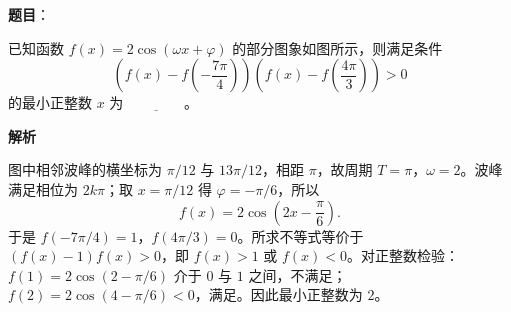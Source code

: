 \begin{answer}

\textbf{题目}：

已知函数 $f(x)=2\cos(\omega x+\varphi)$ 的部分图象如图所示，则满足条件
\nopagebreak[4]
\[
\left(f(x)-f\left(-\dfrac{7\pi}{4}\right)\right)\left(f(x)-f\left(\dfrac{4\pi}{3}\right)\right)>0
\]
的最小正整数 $x$ 为 $\underline{\qquad\qquad}$。
\nopagebreak[4]
\begin{center}\end{center}
\nopagebreak[4]
\textbf{解析}

图中相邻波峰的横坐标为 $\pi/12$ 与 $13\pi/12$，相距 $\pi$，故周期 $T=\pi$，$\omega=2$。波峰满足相位为 $2k\pi$；取 $x=\pi/12$ 得 $\varphi=-\pi/6$，所以
\nopagebreak[4]
\[
f(x)=2\cos\left(2x-\frac\pi6\right).
\]
于是 $f(-7\pi/4)=1$，$f(4\pi/3)=0$。所求不等式等价于 $(f(x)-1)f(x)>0$，即 $f(x)>1$ 或 $f(x)<0$。对正整数检验：$f(1)=2\cos(2-\pi/6)$ 介于 $0$ 与 $1$ 之间，不满足；$f(2)=2\cos(4-\pi/6)<0$，满足。因此最小正整数为 $2$。


\par\medskip

\end{answer}

